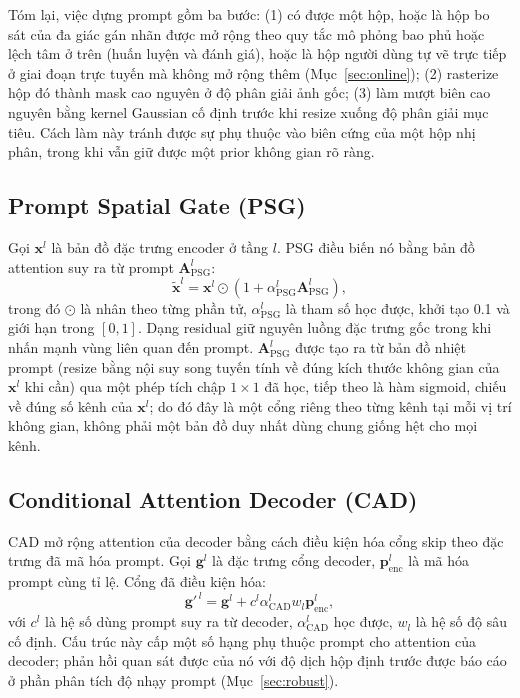 \documentclass[11pt]{article}
\begin{document}
Tóm lại, việc dựng prompt gồm ba bước: (1) có được một hộp, hoặc là hộp bo sát của đa giác gán nhãn được mở rộng theo quy tắc mô phỏng bao phủ hoặc lệch tâm ở trên (huấn luyện và đánh giá), hoặc là hộp người dùng tự vẽ trực tiếp ở giai đoạn trực tuyến mà không mở rộng thêm (Mục~\ref{sec:online}); (2) rasterize hộp đó thành mask cao nguyên ở độ phân giải ảnh gốc; (3) làm mượt biên cao nguyên bằng kernel Gaussian cố định trước khi resize xuống độ phân giải mục tiêu. Cách làm này tránh được sự phụ thuộc vào biên cứng của một hộp nhị phân, trong khi vẫn giữ được một prior không gian rõ ràng.

\subsection{Prompt Spatial Gate (PSG)}
Gọi $\mathbf{x}^{l}$ là bản đồ đặc trưng encoder ở tầng $l$. PSG điều biến nó bằng bản đồ attention suy ra từ prompt $\mathbf{A}^{l}_{\mathrm{PSG}}$:
\begin{equation}
\widetilde{\mathbf{x}}^{l} = \mathbf{x}^{l}\odot\left(1+\alpha^{l}_{\mathrm{PSG}}\mathbf{A}^{l}_{\mathrm{PSG}}\right),
\end{equation}
trong đó $\odot$ là nhân theo từng phần tử, $\alpha^{l}_{\mathrm{PSG}}$ là tham số học được, khởi tạo 0.1 và giới hạn trong $[0,1]$. Dạng residual giữ nguyên luồng đặc trưng gốc trong khi nhấn mạnh vùng liên quan đến prompt. $\mathbf{A}^{l}_{\mathrm{PSG}}$ được tạo ra từ bản đồ nhiệt prompt (resize bằng nội suy song tuyến tính về đúng kích thước không gian của $\mathbf{x}^{l}$ khi cần) qua một phép tích chập $1\times1$ đã học, tiếp theo là hàm sigmoid, chiếu về đúng số kênh của $\mathbf{x}^{l}$; do đó đây là một cổng riêng theo từng kênh tại mỗi vị trí không gian, không phải một bản đồ duy nhất dùng chung giống hệt cho mọi kênh.

\subsection{Conditional Attention Decoder (CAD)}
CAD mở rộng attention của decoder bằng cách điều kiện hóa cổng skip theo đặc trưng đã mã hóa prompt. Gọi $\mathbf{g}^{l}$ là đặc trưng cổng decoder, $\mathbf{p}^{l}_{\mathrm{enc}}$ là mã hóa prompt cùng tỉ lệ. Cổng đã điều kiện hóa:
\begin{equation}
\mathbf{g}'^{\,l}=\mathbf{g}^{l}+c^{l}\alpha^{l}_{\mathrm{CAD}}w_{l}\mathbf{p}^{l}_{\mathrm{enc}},
\end{equation}
với $c^{l}$ là hệ số dùng prompt suy ra từ decoder, $\alpha^{l}_{\mathrm{CAD}}$ học được, $w_{l}$ là hệ số độ sâu cố định. Cấu trúc này cấp một số hạng phụ thuộc prompt cho attention của decoder; phản hồi quan sát được của nó với độ dịch hộp định trước được báo cáo ở phần phân tích độ nhạy prompt (Mục~\ref{sec:robust}).
\end{document}
